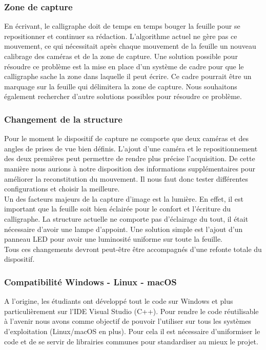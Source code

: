 \subsubsection{Zone de capture}

En écrivant, le calligraphe doit de temps en temps bouger la feuille pour se repositionner et continuer sa rédaction. L'algorithme actuel ne gère pas ce mouvement, ce qui nécessitait après chaque mouvement de la feuille un nouveau calibrage des caméras et de la zone de capture. Une solution possible pour résoudre ce problème est la mise en place d'un système de cadre pour que le calligraphe sache la zone dans laquelle il peut écrire. Ce cadre pourrait être un marquage sur la feuille qui délimitera la zone de capture. Nous souhaitons également rechercher d'autre solutions possibles pour résoudre ce problème.

\subsubsection{Changement de la structure}

Pour le moment le dispositif de capture ne comporte que deux caméras et des angles de prises de vue bien définis. L'ajout d'une caméra et le repositionnement des deux premières peut permettre de rendre plus précise l'acquisition. De cette manière nous aurions à notre disposition des informations supplémentaires pour améliorer la reconstitution du mouvement. Il nous faut donc tester différentes configurations et choisir la meilleure. \\

Un des facteurs majeurs de la capture d'image est la lumière. En effet, il est important que la feuille soit bien éclairée pour le confort et l'écriture du calligraphe. La structure actuelle ne comporte pas d'éclairage du tout, il était nécessaire d'avoir une lampe d’appoint. Une solution simple est l'ajout d'un panneau LED pour avoir une luminosité uniforme sur toute la feuille. \\

Tous ces changements devront peut-être être accompagnés d'une refonte totale du dispositif.

\subsubsection{Compatibilité Windows - Linux - macOS}

A l'origine, les étudiants ont développé tout le code sur Windows et plus particulièrement sur l'IDE Visual Studio (C++). Pour rendre le code réutilisable à l'avenir nous avons comme objectif de pouvoir l'utiliser sur tous les systèmes d'exploitation (Linux/macOS en plus). Pour cela il est nécessaire d'uniformiser le code et de se servir de librairies communes pour standardiser au mieux le projet.